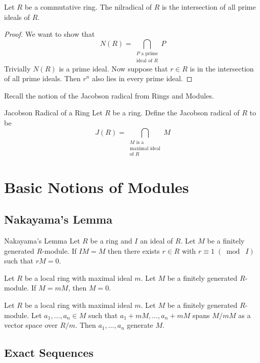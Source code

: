 \documentclass[a4paper]{article}
\begin{document}
\begin{prp}{}{} Let $R$ be a commutative ring. The nilradical of $R$ is the intersection of all prime ideals of $R$. \tcbline
\begin{proof}
We want to show that $$N(R)=\bigcap_{\substack{P\text{ a prime}\\\text{ideal of }R}}P$$
Trivially $N(R)$ is a prime ideal. Now suppose that $r\in R$ is in the intersection of all prime ideals. Then $r^n$ also lies in every prime ideal. 
\end{proof}
\end{prp}

Recall the notion of the Jacobson radical from Rings and Modules. 

\begin{defn}{Jacobson Radical of a Ring}{} Let $R$ be a ring. Define the Jacobson radical of $R$ to be $$J(R)=\bigcap_{\substack{M\text{ is a}\\\text{maximal ideal}\\\text{of }R}}M$$
\end{defn}

\pagebreak
\section{Basic Notions of Modules}
\subsection{Nakayama's Lemma}
\begin{lmm}{Nakayama's Lemma}{} Let $R$ be a ring and $I$ an ideal of $R$. Let $M$ be a finitely generated $R$-module. If $IM=M$ then there exists $r\in R$ with $r\equiv 1\;(\bmod\;I)$ such that $rM=0$. 
\end{lmm}

\begin{lmm}{}{} Let $R$ be a local ring with maximal ideal $m$. Let $M$ be a finitely generated $R$-module. If $M=mM$, then $M=0$. 
\end{lmm}

\begin{lmm}{}{} Let $R$ be a local ring with maximal ideal $m$. Let $M$ be a finitely generated $R$-module. Let $a_1,\dots,a_n\in M$ such that $a_1+mM,\dots,a_n+mM$ spans $M/mM$ as a vector space over $R/m$. Then $a_1,\dots,a_n$ generate $M$. 
\end{lmm}

\subsection{Exact Sequences}
\end{document}
